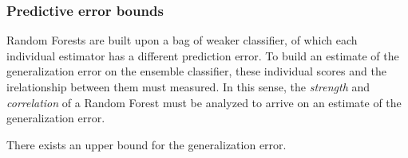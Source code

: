 \subsubsection{Predictive error bounds}

Random Forests are built upon a bag of weaker classifier, of which each individual estimator has a different prediction error. To build an estimate of the generalization error on the ensemble classifier, these individual scores and the irelationship between them must measured. In this sense, the \textit{strength} and \textit{correlation} of a Random Forest must be analyzed to arrive on an estimate of the generalization error.


\begin{theorem}
There exists an upper bound for the generalization error.
\end{theorem}


